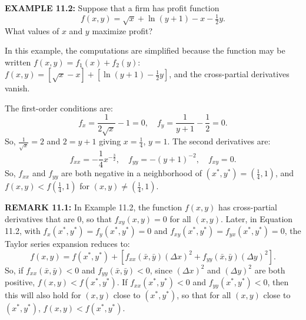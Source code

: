 \begin{original}
\textbf{EXAMPLE 11.2:} Suppose that a firm has profit function
\[
f(x, y) = \sqrt{x} + \ln(y+1) - x - \tfrac{1}{2}y.
\]
What values of $x$ and $y$ maximize profit?

In this example, the computations are simplified because the function may be written $f(x, y) = f_1(x) + f_2(y)$: $f(x, y) = [\sqrt{x} - x] + [\ln(y+1) - \frac{1}{2}y]$, and the cross-partial derivatives vanish.

The first-order conditions are:
\[
f_x = \frac{1}{2\sqrt{x}} - 1 = 0, \quad f_y = \frac{1}{y+1} - \frac{1}{2} = 0.
\]
So, $\frac{1}{\sqrt{x}} = 2$ and $2 = y+1$ giving $x = \frac{1}{4}$, $y = 1$. The second derivatives are:
\[
f_{xx} = -\frac{1}{4}x^{-\frac{3}{2}}, \quad f_{yy} = -(y+1)^{-2}, \quad f_{xy} = 0.
\]
So, $f_{xx}$ and $f_{yy}$ are both negative in a neighborhood of $(x^*, y^*) = (\frac{1}{4}, 1)$, and $f(x, y) < f(\frac{1}{4}, 1)$ for $(x, y) \neq (\frac{1}{4}, 1)$.

\textbf{REMARK 11.1:} In Example 11.2, the function $f(x, y)$ has cross-partial derivatives that are 0, so that $f_{xy}(x, y) = 0$ for all $(x, y)$. Later, in Equation 11.2, with $f_x(x^*, y^*) = f_y(x^*, y^*) = 0$ and $f_{xy}(x^*, y^*) = f_{yx}(x^*, y^*) = 0$, the Taylor series expansion reduces to:
\[
f(x, y) = f(x^*, y^*) + [f_{xx}(\bar{x}, \bar{y})(\Delta x)^2 + f_{yy}(\bar{x}, \bar{y})(\Delta y)^2].
\]
So, if $f_{xx}(\bar{x}, \bar{y}) < 0$ and $f_{yy}(\bar{x}, \bar{y}) < 0$, since $(\Delta x)^2$ and $(\Delta y)^2$ are both positive, $f(x, y) < f(x^*, y^*)$. If $f_{xx}(x^*, y^*) < 0$ and $f_{yy}(x^*, y^*) < 0$, then this will also hold for $(x, y)$ close to $(x^*, y^*)$, so that for all $(x, y)$ close to $(x^*, y^*)$, $f(x, y) < f(x^*, y^*)$.
\end{original}
